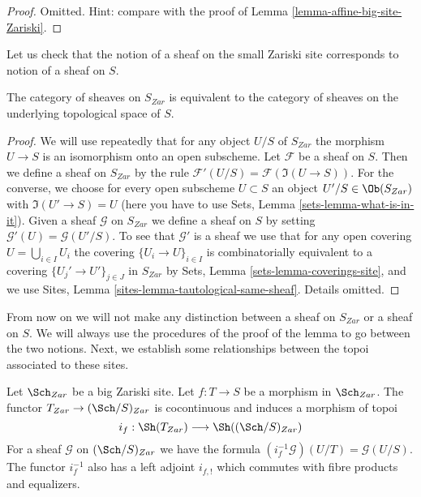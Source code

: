 \begin{proof}
Omitted. Hint: compare with the proof of
Lemma \ref{lemma-affine-big-site-Zariski}.
\end{proof}

\noindent
Let us check that the notion of a sheaf on the small Zariski site
corresponds to notion of a sheaf on $S$.

\begin{lemma}
\label{lemma-Zariski-usual}
The category of sheaves on $S_{Zar}$ is equivalent to the
category of sheaves on the underlying topological space of $S$.
\end{lemma}

\begin{proof}
We will use repeatedly that for any object
$U/S$ of $S_{Zar}$ the morphism $U \to S$ is an isomorphism
onto an open subscheme.
Let $\mathcal{F}$ be a sheaf on $S$. Then we define a sheaf
on $S_{Zar}$ by the rule $\mathcal{F}'(U/S) = \mathcal{F}(\Im(U \to S))$.
For the converse, we choose for every open subscheme $U \subset S$ an object
$U'/S \in \Ob(S_{Zar})$ with $\Im(U' \to S) = U$
(here you have to use Sets, Lemma \ref{sets-lemma-what-is-in-it}).
Given a sheaf $\mathcal{G}$ on $S_{Zar}$ we define a sheaf on $S$ by setting
$\mathcal{G}'(U) = \mathcal{G}(U'/S)$. To see that $\mathcal{G}'$ is
a sheaf we use that for any open covering $U = \bigcup_{i \in I} U_i$
the covering $\{U_i \to U\}_{i \in I}$
is combinatorially equivalent to a covering $\{U_j' \to U'\}_{j \in J}$
in $S_{Zar}$ by Sets, Lemma \ref{sets-lemma-coverings-site},
and we use Sites, Lemma \ref{sites-lemma-tautological-same-sheaf}.
Details omitted.
\end{proof}

\noindent
From now on we will not make any distinction between a sheaf on
$S_{Zar}$ or a sheaf on $S$. We will always use the procedures
of the proof of the lemma to go between the two notions.
Next, we establish some relationships between the topoi
associated to these sites.

\begin{lemma}
\label{lemma-put-in-T}
Let $\Sch_{Zar}$ be a big Zariski site.
Let $f : T \to S$ be a morphism in $\Sch_{Zar}$.
The functor $T_{Zar} \to (\Sch/S)_{Zar}$
is cocontinuous and induces a morphism of topoi
$$
i_f :
\Sh(T_{Zar})
\longrightarrow
\Sh((\Sch/S)_{Zar})
$$
For a sheaf $\mathcal{G}$ on $(\Sch/S)_{Zar}$
we have the formula $(i_f^{-1}\mathcal{G})(U/T) = \mathcal{G}(U/S)$.
The functor $i_f^{-1}$ also has a left adjoint $i_{f, !}$ which commutes
with fibre products and equalizers.
\end{lemma}

